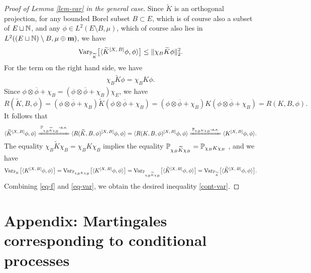 \documentclass[12pt]{paper}
\numberwithin{theorem}{section}
\numberwithin{figure}{section}
\numberwithin{equation}{section}
\begin{document}
\begin{proof}[Proof of Lemma \ref{lem-var} in the general case]
Since $\widetilde{K}$ is an orthogonal projection,  for any bounded Borel subset $B\subset  E$, which is of course also a subset of $E\sqcup \mathbb{N}$,  and any $\phi \in L^2(  E\setminus B, \mu)$, which  of course also lies in $L^2((E\sqcup \mathbb{N}) \setminus B, \mu \oplus {\bf m})$, we have
\begin{align*}
\mathrm{Var}_{\mathbb{P}_{\widetilde{K}}} \big[\langle \widetilde{K}^{[X, \, B]} \phi, \phi \rangle \big] \le  \|\chi_{B}  \widetilde{K} \phi \|_2^2.
\end{align*}
For the term on the right hand side, we have
\begin{align}\label{eq-f}
\chi_{B}  \widetilde{K} \phi= \chi_B K \phi.
\end{align}
Since  $\phi \otimes \overline{\phi} + \chi_B = (\phi \otimes \overline{\phi} + \chi_B)\chi_E$, we have
\[
R(\widetilde{K}, B, \phi) =  (\phi \otimes \overline{\phi} + \chi_B) \widetilde{K} (\phi \otimes \overline{\phi} + \chi_B) =  (\phi \otimes \overline{\phi} + \chi_B) K (\phi \otimes \overline{\phi} + \chi_B) = R(K, B, \phi).
\]
It follows that
\[
\langle \widetilde{K}^{[X, \, B]} \phi, \phi \rangle   \xlongequal{\text{$\PP_{\chi_B \widetilde{K} \chi_B}$-a.s.}} \langle R(\widetilde{K}, B, \phi) ^{[X, \, B]} \phi, \phi \rangle  =  \langle R(K, B, \phi) ^{[X, \, B]} \phi, \phi \rangle     \xlongequal{\text{$\PP_{\chi_B K \chi_B}$-a.s.}} \langle K^{[X, \, B]} \phi, \phi \rangle.
\]
The equality $\chi_B \widetilde{K}\chi_B =\chi_B K \chi_B$ implies  the equality $\mathbb{P}_{\chi_B \widetilde{K} \chi_B} = \mathbb{P}_{\chi_B {K} \chi_B}$ , and we have
\begin{align}\label{eq-var}
\mathrm{Var}_{\mathbb{P}_{K}} \big[\langle K^{[X, \, B]} \phi, \phi \rangle \big]  = \mathrm{Var}_{\mathbb{P}_{\chi_B K\chi_B}} \big[\langle K^{[X, \, B]} \phi, \phi \rangle \big]  = \mathrm{Var}_{\mathbb{P}_{ \chi_B \widetilde{K}
\chi_B}} \big[\langle \widetilde{K}^{[X, \, B]} \phi, \phi \rangle \big] = \mathrm{Var}_{\mathbb{P}_{\widetilde{K}}} \big[\langle \widetilde{K}^{[X, \, B]} \phi, \phi \rangle \big].
\end{align}
Combining \eqref{eq-f} and \eqref{eq-var}, we obtain the desired inequality  \eqref{cont-var}.
\end{proof}











\section{Appendix: Martingales corresponding to conditional processes}
\end{document}
